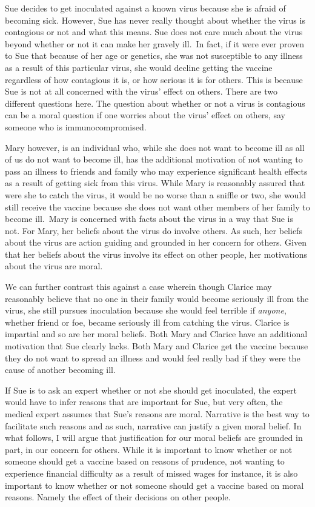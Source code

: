 \documentclass[phdthesis,12pt,final,a4paper]{wuthesis}
\theoremstyle{definition}
\theoremstyle{definition}
\theoremstyle{definition}
\theoremstyle{definition}
\theoremstyle{remark}
\begin{document}
Sue decides to get inoculated against a known virus because she is afraid of becoming sick. However, Sue has never really thought about whether the virus is contagious or not and what this means. Sue does not care much about the virus beyond whether or not it can make her gravely ill.~In fact, if it were ever proven to Sue that because of her age or genetics, she was not susceptible to any illness as a result of this particular virus, she would decline getting the vaccine regardless of how contagious it is, or how serious it is for others. This is because Sue is not at all concerned with the virus' effect on others. There are two different questions here. The question about whether or not a virus is contagious can be a moral question if one worries about the virus' effect on others, say someone who is immunocompromised.

Mary however, is an individual who, while she does not want to become ill as all of us do not want to become ill, has the additional motivation of not wanting to pass an illness to friends and family who may experience significant health effects as a result of getting sick from this virus. While Mary is reasonably assured that were she to catch the virus, it would be no worse than a sniffle or two, she would still receive the vaccine because she does not want other members of her family to become ill.~Mary is concerned with facts about the virus in a way that Sue is not. For Mary, her beliefs about the virus do involve others. As such, her beliefs about the virus are action guiding and grounded in her concern for others. Given that her beliefs about the virus involve its effect on other people, her motivations about the virus are moral.

We can further contrast this against a case wherein though Clarice may reasonably believe that no one in their family would become seriously ill from the virus, she still pursues inoculation because she would feel terrible if \emph{anyone}, whether friend or foe, became seriously ill from catching the virus. Clarice is impartial and so are her moral beliefs. Both Mary and Clarice have an additional motivation that Sue clearly lacks. Both Mary and Clarice get the vaccine because they do not want to spread an illness and would feel really bad if they were the cause of another becoming ill.

If Sue is to ask an expert whether or not she should get inoculated, the expert would have to infer reasons that are important for Sue, but very often, the medical expert assumes that Sue's reasons are moral. Narrative is the best way to facilitate such reasons and as such, narrative can justify a given moral belief. In what follows, I will argue that justification for our moral beliefs are grounded in part, in our concern for others. While it is important to know whether or not someone should get a vaccine based on reasons of prudence, not wanting to experience financial difficulty as a result of missed wages for instance, it is also important to know whether or not someone should get a vaccine based on moral reasons. Namely the effect of their decisions on other people.
\end{document}
